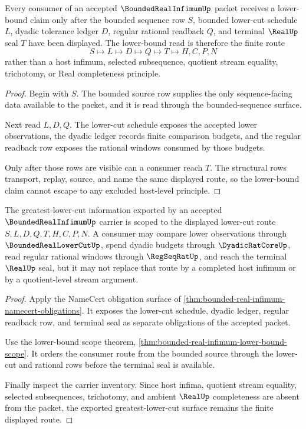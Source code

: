 \begin{theorem}
\label{thm:bounded-real-infimum-lower-bound-scope}
Every consumer of an accepted $\BoundedRealInfimumUp$ packet receives a lower-bound claim only after the bounded sequence row $S$, bounded lower-cut schedule $L$, dyadic tolerance ledger $D$, regular rational readback $Q$, and terminal $\RealUp$ seal $T$ have been displayed. The lower-bound read is therefore the finite route
$$
S \longmapsto L \longmapsto D \longmapsto Q \longmapsto T \longmapsto H,C,P,N
$$
rather than a host infimum, selected subsequence, quotient stream equality, trichotomy, or Real completeness principle.
\end{theorem}
\begin{proof}
Begin with $S$. The bounded source row supplies the only sequence-facing data available to the packet, and it is read through the bounded-sequence surface.

Next read $L,D,Q$. The lower-cut schedule exposes the accepted lower observations, the dyadic ledger records finite comparison budgets, and the regular readback row exposes the rational windows consumed by those budgets.

Only after those rows are visible can a consumer reach $T$. The structural rows transport, replay, source, and name the same displayed route, so the lower-bound claim cannot escape to any excluded host-level principle.
\end{proof}

\begin{theorem}
\label{thm:bounded-real-infimum-greatest-lower-cut-scope}
The greatest-lower-cut information exported by an accepted $\BoundedRealInfimumUp$ carrier is scoped to the displayed lower-cut route $S,L,D,Q,T,H,C,P,N$. A consumer may compare lower observations through $\BoundedRealLowerCutUp$, spend dyadic budgets through $\DyadicRatCoreUp$, read regular rational windows through $\RegSeqRatUp$, and reach the terminal $\RealUp$ seal, but it may not replace that route by a completed host infimum or by a quotient-level stream argument.
\end{theorem}
\begin{proof}
Apply the NameCert obligation surface of \autoref{thm:bounded-real-infimum-namecert-obligations}. It exposes the lower-cut schedule, dyadic ledger, regular readback row, and terminal seal as separate obligations of the accepted packet.

Use the lower-bound scope theorem, \autoref{thm:bounded-real-infimum-lower-bound-scope}. It orders the consumer route from the bounded source through the lower-cut and rational rows before the terminal seal is available.

Finally inspect the carrier inventory. Since host infima, quotient stream equality, selected subsequences, trichotomy, and ambient $\RealUp$ completeness are absent from the packet, the exported greatest-lower-cut surface remains the finite displayed route.
\end{proof}


